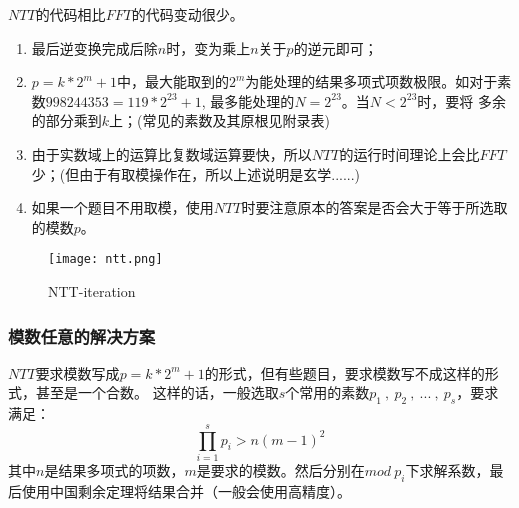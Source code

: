 $NTT$的代码相比$FFT$的代码变动很少。
\begin{note}
\begin{enumerate}
\item 最后逆变换完成后除$n$时，变为乘上$n$关于$p$的逆元即可；
\item $p=k*2^m + 1$中，最大能取到的$2^m$为能处理的结果多项式项数极限。如对于素数$998244353= 119 * 2^{23} + 1$, 最多能处理的$N = 2^{23}$。当$N<2^{23}$时，要将
多余的部分乘到$k$上；(常见的素数及其原根见附录表)
\item 由于实数域上的运算比复数域运算要快，所以$NTT$的运行时间理论上会比$FFT$少；(但由于有取模操作在，所以上述说明是玄学......)
\item 如果一个题目不用取模，使用$NTT$时要注意原本的答案是否会大于等于所选取的模数$p$。
\end{enumerate}
\end{note}

\begin{figure}[!htbp]
	\centering
	\texttt{[image: ntt.png]}
	\caption{NTT-iteration \label{fig:ntt}}
\end{figure}



\subsubsection{模数任意的解决方案}
$NTT$要求模数写成$p=k*2^m + 1$的形式，但有些题目，要求模数写不成这样的形式，甚至是一个合数。
这样的话，一般选取$s$个常用的素数$p_1\ ,\ p_2\ ,\ ...\ ,\ p_s$，要求满足：
$$
\prod_{i=1}^s p_i > n(m-1)^2
$$
其中$n$是结果多项式的项数，$m$是要求的模数。然后分别在$mod\ p_i$下求解系数，最后使用中国剩余定理将结果合并（一般会使用高精度）。






